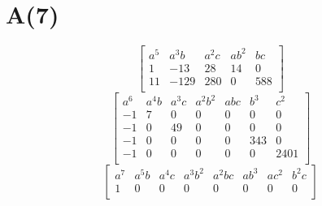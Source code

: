 \documentclass[10pt]{amsart}
\begin{document}
\section*{A(7)}
\[ \begin{bmatrix}
a^{5} & a^{3}b & a^{2}c & ab^{2} & bc \\
1 & -13 & 28 & 14 & 0 \\
11 & -129 & 280 & 0 & 588 \\
\end{bmatrix} \]
\[ \begin{bmatrix}
a^{6} & a^{4}b & a^{3}c & a^{2}b^{2} & abc & b^{3} & c^{2} \\
-1 & 7 & 0 & 0 & 0 & 0 & 0 \\
-1 & 0 & 49 & 0 & 0 & 0 & 0 \\
-1 & 0 & 0 & 0 & 0 & 343 & 0 \\
-1 & 0 & 0 & 0 & 0 & 0 & 2401 \\
\end{bmatrix} \]
\[ \begin{bmatrix}
a^{7} & a^{5}b & a^{4}c & a^{3}b^{2} & a^{2}bc & ab^{3} & ac^{2} & b^{2}c \\
1 & 0 & 0 & 0 & 0 & 0 & 0 & 0 \\
\end{bmatrix} \]
\end{document}
